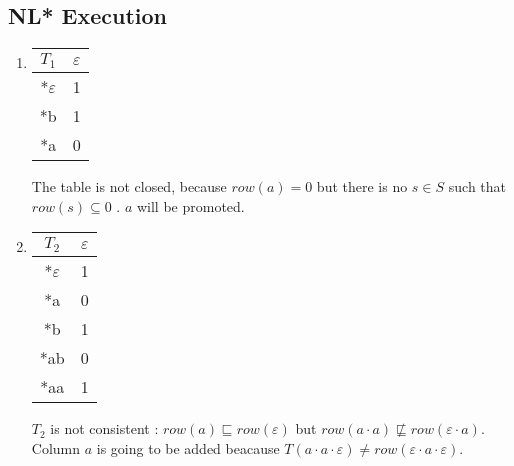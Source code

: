 \subsection{NL* Execution}
\begin{enumerate}
  \item \begin{minipage}{0.3\textwidth}
          \begin{tabular}{c||c}
            $T_1$                       & $\varepsilon$ \\
            \hline\hline
            *$\varepsilon$\footnotemark & 1             \\
            \hline\hline
            *b                          & 1             \\
            *a                          & 0             \\
          \end{tabular}
        \end{minipage}  \quad
        \begin{minipage}{0.6\textwidth}
          The table is not closed, because $row(a) = 0$ but there is no $s \in S$ such that $row(s) \subseteq 0$ . $a$ will be promoted.
        \end{minipage}

  \item \begin{minipage}{0.3\textwidth}
          \begin{tabular}{c||c}
            $T_2$          & $\varepsilon$ \\
            \hline\hline
            *$\varepsilon$ & 1             \\
            *a             & 0             \\
            \hline\hline
            *b             & 1             \\
            *ab            & 0             \\
            *aa            & 1             \\
          \end{tabular}
        \end{minipage}\quad
        \begin{minipage}{0.6\textwidth}
          $T_2$ is not consistent : $row(a) \sqsubseteq row(\varepsilon)$ but $row(a \cdot a) \not\sqsubseteq row(\varepsilon \cdot a)$. Column $a$ is going to be added beacause $T(a \cdot a \cdot \varepsilon) \neq row(\varepsilon \cdot a \cdot \varepsilon)$.
        \end{minipage}


\end{enumerate}
